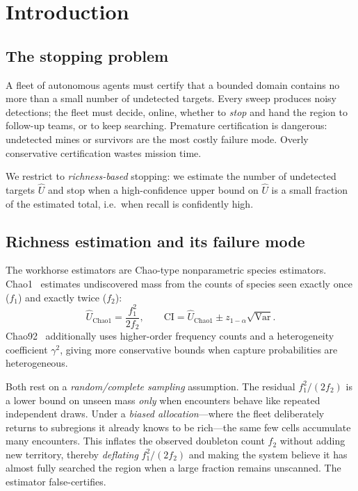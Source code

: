\documentclass[11pt]{article}
\newcommand{\Uhat}{\hat{U}}
\begin{document}
\section{Introduction}
\label{sec:intro}

\subsection{The stopping problem}

A fleet of autonomous agents must certify that a bounded domain contains no more than a small
number of undetected targets. Every sweep produces noisy detections; the fleet must decide,
online, whether to \emph{stop} and hand the region to follow-up teams, or to keep searching.
Premature certification is dangerous: undetected mines or survivors are the most costly failure
mode. Overly conservative certification wastes mission time.

We restrict to \emph{richness-based} stopping: we estimate the number of undetected targets
$\Uhat$ and stop when a high-confidence upper bound on $\Uhat$ is a small fraction of the
estimated total, i.e.\ when recall is confidently high.

\subsection{Richness estimation and its failure mode}

The workhorse estimators are Chao-type nonparametric species estimators. Chao1~\cite{chao1987}
estimates undiscovered mass from the counts of species seen exactly once ($f_1$) and exactly twice
($f_2$):
\begin{equation}
\Uhat_{\mathrm{Chao1}} = \frac{f_1^2}{2 f_2},
\qquad
\mathrm{CI} = \Uhat_{\mathrm{Chao1}} \pm z_{1-\alpha}\sqrt{\mathrm{Var}} .
\label{eq:chao1}
\end{equation}
Chao92~\cite{chao1992} additionally uses higher-order frequency counts and a heterogeneity
coefficient $\gamma^2$, giving more conservative bounds when capture probabilities are
heterogeneous.

Both rest on a \emph{random/complete sampling} assumption. The residual $f_1^2/(2f_2)$ is a lower
bound on unseen mass \emph{only} when encounters behave like repeated independent draws. Under a
\emph{biased allocation}---where the fleet deliberately returns to subregions it already knows to
be rich---the same few cells accumulate many encounters. This inflates the observed doubleton count
$f_2$ without adding new territory, thereby \emph{deflating} $f_1^2/(2f_2)$ and making the system
believe it has almost fully searched the region when a large fraction remains unscanned. The
estimator false-certifies.
\end{document}
